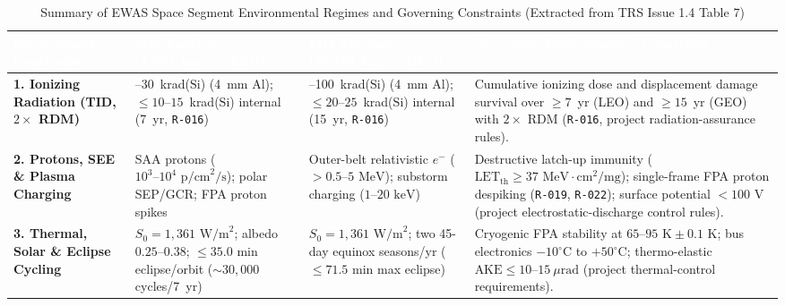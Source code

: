 \documentclass[11pt,a4paper]{article}
\newcommand{\thead}[1]{\textcolor{white}{\textbf{\textsf{#1}}}}
\providecommand{\abbr}[1]{#1}
\begin{document}
\begin{table}[H]
\centering
\caption{Summary of EWAS Space Segment Environmental Regimes and Governing Constraints (Extracted from TRS Issue 1.4 Table 7)}
\label{tab:sseg_env_constraints_archived}
{\scriptsize\setlength{\tabcolsep}{4pt}\renewcommand{\arraystretch}{1.05}%
%
%
\noindent
\begin{tabularx}{\textwidth}{|>{\raggedright\arraybackslash}p{2.4cm}|>{\raggedright\arraybackslash}p{2.8cm}|>{\raggedright\arraybackslash}p{2.8cm}|>{\raggedright\arraybackslash}X|}
    \hline
    \rowcolor{TableHeaderBlue}
    \thead{Environment / Constraint} & \thead{\texttt{SATL} Envelope (1,000~km, $80^\circ$ LEO)} & \thead{\texttt{SATG} Envelope (35,786~km, $0^\circ$ GEO)} & \thead{Governing Environmental Constraint} \\ \hline
    \textbf{1. Ionizing Radiation (\abbr{TID}, $2\times$ RDM)} & 18--30~krad($\mathrm{Si}$) (4~mm Al); $\le 10\text{--}15$~krad($\mathrm{Si}$) internal (7~yr, \texttt{R-016}) & 60--100~krad($\mathrm{Si}$) (4~mm Al); $\le 20\text{--}25$~krad($\mathrm{Si}$) internal (15~yr, \texttt{R-016}) & Cumulative ionizing dose and displacement damage survival over $\ge 7$~yr (\abbr{LEO}) and $\ge 15$~yr (\abbr{GEO}) with $2\times$ \abbr{RDM} (\texttt{R-016}, project radiation-assurance rules). \\ \hline
    \textbf{2. Protons, \abbr{SEE} \& Plasma Charging} & \abbr{SAA} protons ($10^3\text{--}10^4\text{ p/cm}^2\text{/s}$); polar \abbr{SEP}/\abbr{GCR}; \abbr{FPA} proton spikes & Outer-belt relativistic $e^-$ ($> 0.5\text{--}5\text{ MeV}$); substorm charging ($1\text{--}20\text{ keV}$) & Destructive latch-up immunity ($\text{LET}_{\text{th}} \ge 37\text{ MeV}\cdot\text{cm}^2\text{/mg}$); single-frame \abbr{FPA} proton despiking (\texttt{R-019}, \texttt{R-022}); surface potential $< 100\text{ V}$ (project electrostatic-discharge control rules). \\ \hline
    \textbf{3. Thermal, Solar \& Eclipse Cycling} & $S_0 = 1{,}361\text{ W/m}^2$; albedo $0.25\text{--}0.38$; $\le 35.0\text{ min}$ eclipse/orbit ($\sim 30{,}000$ cycles/7~yr) & $S_0 = 1{,}361\text{ W/m}^2$; two 45-day equinox seasons/yr ($\le 71.5\text{ min}$ max eclipse) & Cryogenic \abbr{FPA} stability at $65\text{--}95\text{ K} \pm 0.1\text{ K}$; bus electronics $-10^\circ\text{C}$ to $+50^\circ\text{C}$; thermo-elastic $\text{AKE} \le 10\text{--}15~\mu\mathrm{rad}$ (project thermal-control requirements). \\ \hline

\end{tabularx}}
\end{table}
\end{document}
